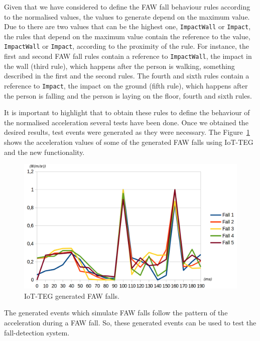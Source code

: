 \documentclass[journal]{IEEEtran}
\begin{document}
Given that we have considered to define the FAW fall behaviour
rules according to the normalised values, the values to generate depend on the maximum value. Due to there are two 
values that can be the highest one, \texttt{\small{ImpactWall}} or \texttt{\small{Impact}}, the rules that depend on the maximum 
value contain the reference to the value, \texttt{\small{ImpactWall}} or \texttt{\small{Impact}}, according to the proximity
of the rule. For instance, the first and second FAW fall rules contain a reference to \texttt{\small{ImpactWall}}, the impact 
in the wall (third rule), which happens after the person is walking, something described in the first and the second rules.
The fourth and sixth rules contain a reference to \texttt{\small{Impact}}, the impact on the ground (fifth rule), which happens
after the person is falling and the person is laying on the floor, fourth and sixth rules.

It is important to highlight that to obtain these rules to define the behaviour of the normalised acceleration several tests
have been done. Once we obtained the desired results, test events were generated as they were necessary. The 
Figure~\ref{fig:IoTTEGFAWGeneratedEvents} shows the acceleration values of some of the generated FAW falls using
IoT-TEG and the new functionality.

\begin{figure}[!ht]
  \centering
  \includegraphics[scale=0.2]{img/IoTTEGFAWGeneratedEvents}
  \caption[IoT-TEG generated FAW falls]{IoT-TEG generated FAW falls.}
  \label{fig:IoTTEGFAWGeneratedEvents}
\end{figure}

The generated events which simulate FAW falls follow the pattern of the acceleration during a FAW fall.
So, these generated events can be used to test the fall-detection system.
\end{document}
